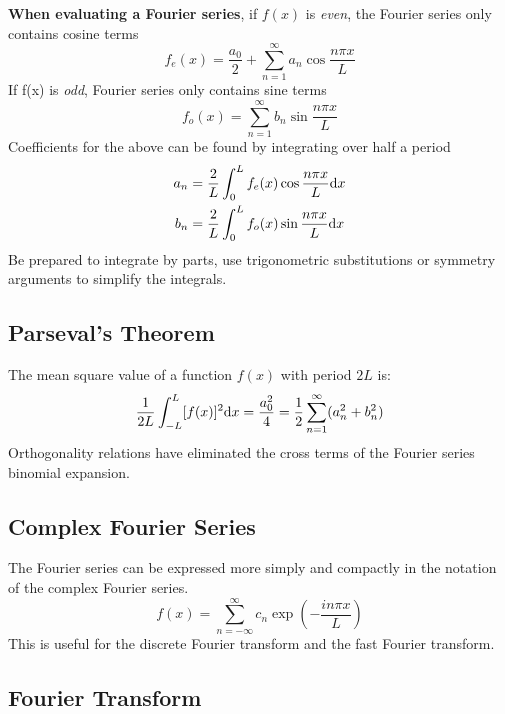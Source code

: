 \textbf{When evaluating a Fourier series}, if $f(x)$ is \textit{even}, the Fourier series only contains cosine terms
\begin{equation*}
    f_e(x) = \frac{a_0}{2} + \sum_{n=1}^{\infty} a_n \cos \frac{n \pi x}{L}
\end{equation*}
If f(x) is \textit{odd}, Fourier series only contains sine terms
\begin{equation*}
    f_o(x) =  \sum_{n=1}^{\infty} b_n \sin \frac{n \pi x}{L}
\end{equation*}
Coefficients for the above can be found by integrating over half a period
\begin{equation*}
    \begin{aligned}
        a_n &= \frac{2}{L}\int_{0}^{L} f_e(x) \cos \frac{n \pi x}{L} \differential x \\
        b_n &= \frac{2}{L}\int_{0}^{L} f_o(x) \sin \frac{n \pi x}{L} \differential x
    \end{aligned}
\end{equation*}
Be prepared to integrate by parts, use trigonometric substitutions or symmetry arguments to simplify the integrals.

\subsection*{Parseval's Theorem}
The mean square value of a function $f(x)$ with period $2L$ is:
\begin{equation*}
    \frac{1}{2L}\int_{-L}^{L}[f(x)]^2 \differential x = \frac{a_0^2}{4} = \frac{1}{2}\sum_{n=1}^{\infty}(a_n^2 + b_n^2)
\end{equation*}
Orthogonality relations have eliminated the cross terms of the Fourier series binomial expansion.
\subsection*{Complex Fourier Series}
The Fourier series can be expressed more simply and compactly in the notation of the complex Fourier series.
\begin{equation*}
    f(x) = \sum_{n = -\infty}^{\infty}c_n \exp\left(-\frac{in\pi x}{L}\right)
\end{equation*}
This is useful for the discrete Fourier transform and the fast Fourier transform.

\subsection*{Fourier Transform}